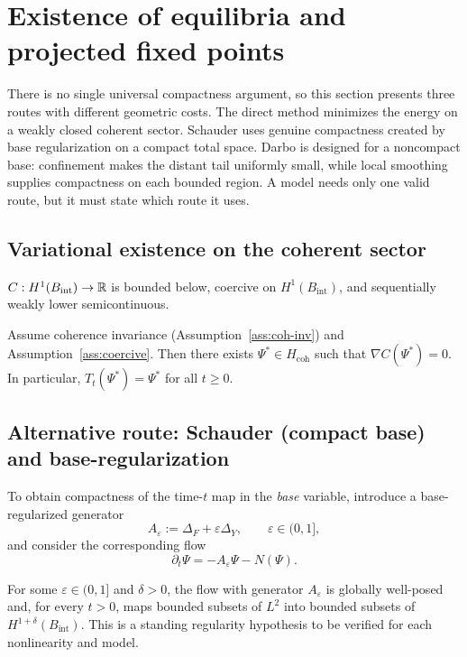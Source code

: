 \documentclass[11pt]{article}
\providecommand{\Bint}{B_{\mathrm{int}}}
\providecommand{\Hcoh}{H_{\mathrm{coh}}}
\providecommand{\Aeps}{A_\varepsilon}
\begin{document}
\section{Existence of equilibria and projected fixed points}

There is no single universal compactness argument, so this section presents
three routes with different geometric costs.  The direct method minimizes the
energy on a weakly closed coherent sector.  Schauder uses genuine compactness
created by base regularization on a compact total space.  Darbo is designed
for a noncompact base: confinement makes the distant tail uniformly small,
while local smoothing supplies compactness on each bounded region.  A model
needs only one valid route, but it must state which route it uses.

\subsection{Variational existence on the coherent sector}

\begin{assumption}\label{ass:coercive}
$C:H^1(\Bint)\to\bbR$ is bounded below, coercive on $H^1(\Bint)$, and sequentially weakly lower semicontinuous.
\end{assumption}

\begin{theorem}\label{thm:variational}
Assume coherence invariance (Assumption~\ref{ass:coh-inv}) and Assumption~\ref{ass:coercive}.
Then there exists $\Psi^\ast\in \Hcoh$ such that $\nabla C(\Psi^\ast)=0$.
In particular, $T_t(\Psi^\ast)=\Psi^\ast$ for all $t\ge 0$.
\end{theorem}

\subsection{Alternative route: Schauder (compact base) and base-regularization}\label{sec:schauder}

To obtain compactness of the time-$t$ map in the \emph{base} variable, introduce a base-regularized generator
\[
\Aeps := \Delta_F + \varepsilon \Delta_Y,\qquad \varepsilon\in(0,1],
\]
and consider the corresponding flow
\[
\partial_t\Psi = -\Aeps\Psi - N(\Psi).
\]

\begin{assumption}\label{ass:base-reg}
For some $\varepsilon\in(0,1]$ and $\delta>0$, the flow with generator
$\Aeps$ is globally well-posed and, for every $t>0$, maps bounded subsets of
$L^2$ into bounded subsets of $H^{1+\delta}(\Bint)$. This is a standing
regularity hypothesis to be verified for each nonlinearity and model.
\end{assumption}
\end{document}

